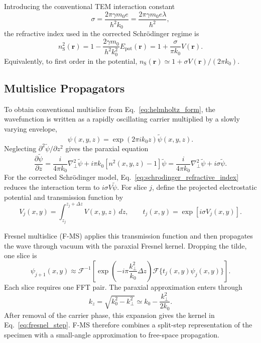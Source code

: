 \documentclass[preprint,12pt,number]{elsarticle}
\begin{document}
Introducing the conventional TEM interaction constant
\cite{ChenVanDyck1997,kirkland2010advanced}
\begin{equation}
\sigma
=
\frac{2\pi\gamma m_0e}{h^2k_0}
=
\frac{2\pi\gamma m_0e\lambda}{h^2},
\label{eq:interaction_constant}
\end{equation}
the refractive index used in the corrected Schr\"odinger regime is
\begin{equation}
n_{\mathrm S}^2(\mathbf r)
=
1
-
\frac{2\gamma m_0}{h^2k_0^2}E_{\mathrm{pot}}(\mathbf r)
=
1+\frac{\sigma}{\pi k_0}V(\mathbf r).
\label{eq:schrodinger_refractive_index}
\end{equation}
Equivalently, to first order in the potential,
$n_{\mathrm S}(\mathbf r)\simeq 1+\sigma V(\mathbf r)/(2\pi k_0)$.


\subsection{Multislice Propagators}
\label{sec:fresnel_angular_spectrum}

To obtain conventional multislice from Eq.~\eqref{eq:helmholtz_form}, 
the wavefunction is written as a rapidly oscillating carrier multiplied by a slowly
varying envelope,
\begin{equation}
\psi(x,y,z)
=
\exp(2\pi i k_0z)\tilde\psi(x,y,z).
\label{eq:carrier_envelope}
\end{equation}
Neglecting $\partial^2\tilde\psi/\partial z^2$ gives the paraxial equation
\begin{equation}
\frac{\partial\tilde\psi}{\partial z}
=
\frac{i}{4\pi k_0}\nabla_\perp^2\tilde\psi
+
i\pi k_0\left[n^2(x,y,z)-1\right]\tilde\psi = \frac{i}{4\pi k_0}\nabla_\perp^2\tilde\psi
+
i\sigma \tilde\psi .
\label{eq:paraxial_helmholtz_intro}
\end{equation}
For the corrected Schr\"odinger model,
Eq.~\eqref{eq:schrodinger_refractive_index} reduces the interaction term to
$i\sigma V\tilde\psi$. For slice $j$, define the projected electrostatic
potential and transmission function by
\begin{equation}
V_j(x,y)
=
\int_{z_j}^{z_j+\Delta z}V(x,y,z)\,dz,
\qquad
t_j(x,y)
=
\exp\left[i\sigma V_j(x,y)\right].
\label{eq:multislice_transmission}
\end{equation}

Fresnel multislice (F-MS) applies this transmission function and then propagates
the wave through vacuum with the paraxial Fresnel kernel. Dropping the tilde,
one slice is
\begin{equation}
\psi_{j+1}(x,y)
\approx
\mathcal F^{-1}
\left[
\exp\left(-i\pi\frac{k_\perp^2}{k_0}\Delta z\right)
\mathcal F\{t_j(x,y)\psi_j(x,y)\}
\right].
\label{eq:fresnel_step}
\end{equation}
Each slice requires one FFT pair. The paraxial approximation enters through
\[
k_z
=
\sqrt{k_0^2-k_\perp^2}
\simeq
k_0-\frac{k_\perp^2}{2k_0}.
\]
After removal of the carrier phase, this expansion gives the kernel in
Eq.~\eqref{eq:fresnel_step}. F-MS therefore combines a split-step
representation of the specimen with a small-angle approximation to free-space
propagation.
\end{document}
